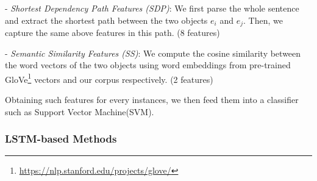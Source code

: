 - \textit{Shortest Dependency Path Features (SDP)}: We first parse the whole sentence and extract the shortest path between the two objects $e_i$ and $e_j$. Then, we capture the same above features in this path. (8 features)

- \textit{Semantic Similarity Features (SS)}: We compute the cosine similarity between the word vectors of the two objects using word embeddings from pre-trained GloVe\footnote{\url{https://nlp.stanford.edu/projects/glove/}} vectors and our corpus respectively. (2 features)

Obtaining such features for every instances, we then feed them into a classifier such as Support Vector Machine(SVM). 

\subsubsection{LSTM-based Methods}
